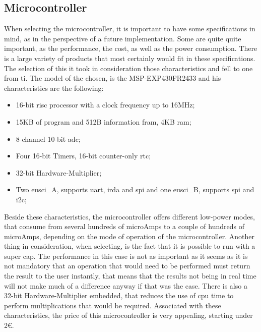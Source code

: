 \subsection{Microcontroller}
When selecting the microcontroller, it is important to have some specifications in mind, as in the perspective of a future implementation. Some are quite quite important, as the performance, the cost, as well as the power consumption. There is a large variety of products that most certainly would fit in these specifications. The selection of this it took in consideration those characteristics and fell to one from \acrlong{ti}. The model of the chosen, is the MSP-EXP430FR2433 and his characteristics are the following:
\begin{itemize}
    \item 16-bit \acrshort{risc} processor with a clock frequency up to 16MHz;
    \item 15KB of program and 512B information \acrshort{fram}, 4KB \acrshort{ram};
    \item 8-channel 10-bit \acrshort{adc};
    \item Four 16-bit Timers, 16-bit counter-only \acrshort{rtc};
    \item 32-bit Hardware-Multiplier;
    \item Two \acrshort{eusci}\_A, supports \acrshort{uart}, \acrshort{irda} and \acrshort{spi} and one \acrshort{eusci}\_B, supports \acrshort{spi} and \acrshort{i2c};
\end{itemize}
Beside these characteristics, the microcontroller offers different low-power modes, that consume from several hundreds of microAmps to a couple of hundreds of microAmps, depending on the mode of operation of the microcontroller. Another thing in consideration, when selecting, is the fact that it is possible to run with a super cap. The performance in this case is not as important as it seems as it is not mandatory that an operation that would need to be performed must return the result to the user instantly, that means that the results not being in real time will not make much of a difference anyway if that was the case. There is also a 32-bit Hardware-Multiplier embedded, that reduces the use of \acrshort{cpu} time to perform multiplications that would be required\cite{MSP430FR2433DataSheet}. Associated with these characteristics, the price of this microcontroller is very appealing, starting under 2€.

